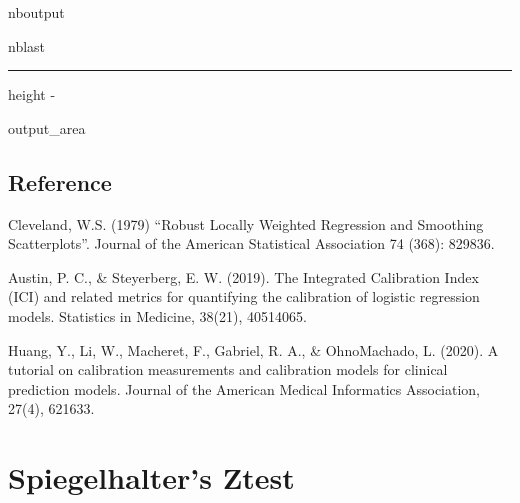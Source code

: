 \documentclass[letterpaper,10pt,english]{sphinxmanual}
\let\sphinxpxdimen\pdfpxdimen\else\newdimen\sphinxpxdimen
\begin{document}
\begin{sphinxuseclass}{nboutput}
\begin{sphinxuseclass}{nblast}
\hrule height -\fboxrule\relax
\vspace{\nbsphinxcodecellspacing}

\makeatletter\setbox\nbsphinxpromptbox\box\voidb@x\makeatother

\begin{nbsphinxfancyoutput}

\begin{sphinxuseclass}{output_area}
\begin{sphinxuseclass}{}
\noindent\sphinxincludegraphics[width=567\sphinxpxdimen,height=453\sphinxpxdimen]{{notebooks_ici_8_1}.png}

\end{sphinxuseclass}
\end{sphinxuseclass}
\end{nbsphinxfancyoutput}

\end{sphinxuseclass}
\end{sphinxuseclass}

\section{Reference}
\label{\detokenize{notebooks/ici:Reference}}
\sphinxAtStartPar
Cleveland, W.S. (1979) “Robust Locally Weighted Regression and Smoothing Scatterplots”. Journal of the American Statistical Association 74 (368): 829\sphinxhyphen{}836.

\sphinxAtStartPar
Austin, P. C., \& Steyerberg, E. W. (2019). The Integrated Calibration Index (ICI) and related metrics for quantifying the calibration of logistic regression models. Statistics in Medicine, 38(21), 4051\textendash{}4065. 

\sphinxAtStartPar
Huang, Y., Li, W., Macheret, F., Gabriel, R. A., \& Ohno\sphinxhyphen{}Machado, L. (2020). A tutorial on calibration measurements and calibration models for clinical prediction models. Journal of the American Medical Informatics Association, 27(4), 621\textendash{}633. 

\sphinxstepscope


\chapter{Spiegelhalter’s Z\sphinxhyphen{}test}
\label{\detokenize{notebooks/spiegelhalter_z:Spiegelhalter's-Z-test}}\label{\detokenize{notebooks/spiegelhalter_z::doc}}
\end{document}
